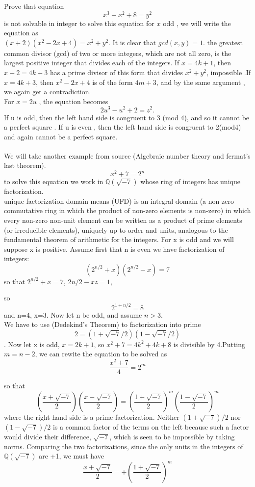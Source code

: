 \documentclass[]{article}
\begin{document}
     Prove that equation 
     $$x^3-x^2+8=y^2$$
     is not solvable in integer to solve this equation for $x$ odd , we will write the equation as 
     \\$(x+2)(x^2-2x+4)=x^2+y^2$.
     It is clear that $gcd(x,y)=1$. 
     the greatest common divisor (gcd) of two or more integers, which are not all zero, is the largest positive integer that divides each of the integers. 
     If $x=4k+1$, then $x+2=4k+3$ has a prime divisor of this form that divides $x^2+y^2$, impossible .If $x=4k+3$, then $x^2-2x+4$ is of the form $4m+3$, and by the same argument , we again get a contradiction. 
     \\ For $x=2u$ , the equation becomes 
     $$2u^3-u^2+2=z^2.$$
     If u is odd, then the left hand side is congruent to 3 (mod 4), and so it cannot be a perfect square . If u is even , then the left hand side is congruent to 2(mod4) and again cannot be a perfect square.\\
     \\We will take another example from source (Algebraic number theory and fermat's last theorem).
     $$x^2+7=2^n$$
    to solve this equation we work in $\mathbb{Q}(\sqrt{-7})$ whose ring of integers has unique factorization.\\
     unique factorization domain means (UFD) is an integral domain (a non-zero commutative ring in which the product of non-zero elements is non-zero) in which every non-zero non-unit element can be written as a product of prime elements (or irreducible elements), uniquely up to order and units, analogous to the fundamental theorem of arithmetic for the integers.
     For x is odd and we will suppose x is positive.
     Assume first that n is even we have factorization of integers:
     $$(2^{n/2}+x)(2^{n/2}-x) =7$$    
     so that $2^{n/2}+x=7$, $2{n/2}-xz=1$,
     
     so 
     $$2^{1+n/2}=8$$ 
     and n=4, x=3.
     Now let n be odd, and assume $n>3$.\\
 We have to use (Dedekind’s Theorem) to factorization into prime \\$$2=(1+\sqrt{-7}/2)(1-\sqrt{-7}/2)$$.
  Now let x is odd, $x=2k+1$, so $x^2+7=4k^2+4k+8$ is divisible by 4.Putting $m=n-2$, we can rewite the equation to be solved as 
  $$\frac{x^2+7} {4}=2^m$$     
  
  so that 
  $$(\frac{x+\sqrt{-7}} {2} )(\frac{x-\sqrt{-7}} {2})=(\frac{1+\sqrt{-7}} {2})^m (\frac{1-\sqrt{-7}} {2})^m$$
  where the right hand side is a prime factorization. Neither $(1+\sqrt{-7})/2$ nor $(1-\sqrt{-7})/2$ is a common factor of the terms on the left because such a factor would divide their difference, $\sqrt{-7}$, which is seen to be impossible by taking norms. Comparing the two factorizations, since the only units in the integers of $\mathbb{Q}(\sqrt{-7})$ are +1, we  must have 
  $$ \frac{x+\sqrt{-7}}{2}=+(\frac{1+\sqrt{-7}}{2})^m$$
  
\end{document}
